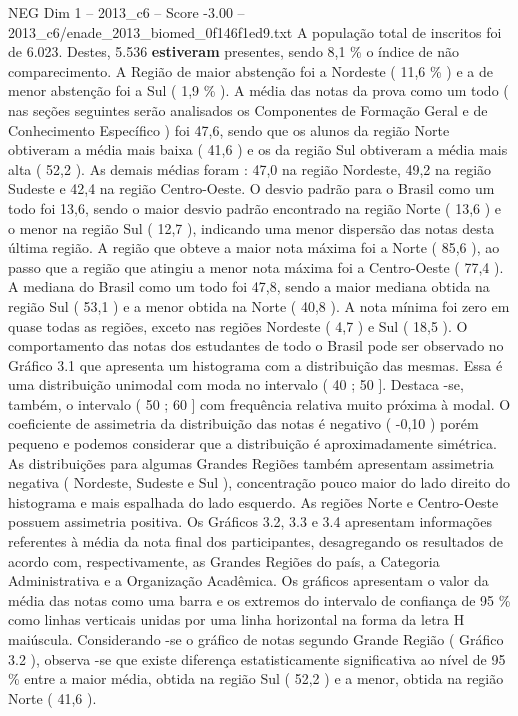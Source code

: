 \begin{textsample}{NEG Dim 1 – 2013\_c6 – Score -3.00 – 2013\_c6/enade\_2013\_biomed\_0f146f1ed9.txt}
A população total de inscritos foi de 6.023.
Destes, 5.536 \textbf{estiveram} presentes, sendo 8,1 \% o índice de não comparecimento.
A Região de maior abstenção foi a Nordeste ( 11,6 \% ) e a de menor abstenção foi a Sul ( 1,9 \% ).
A média das notas da prova como um todo ( nas seções seguintes serão analisados os Componentes de Formação Geral e de Conhecimento Específico ) foi 47,6, sendo que os alunos da região Norte obtiveram a média mais baixa ( 41,6 ) e os da região Sul obtiveram a média mais alta ( 52,2 ).
As demais médias foram : 47,0 na região Nordeste, 49,2 na região Sudeste e 42,4 na região Centro-Oeste.
O desvio padrão para o Brasil como um todo foi 13,6, sendo o maior desvio padrão encontrado na região Norte ( 13,6 ) e o menor na região Sul ( 12,7 ), indicando uma menor dispersão das notas desta última região.
A região que obteve a maior nota máxima foi a Norte ( 85,6 ), ao passo que a região que atingiu a menor nota máxima foi a Centro-Oeste ( 77,4 ).
A mediana do Brasil como um todo foi 47,8, sendo a maior mediana obtida na região Sul ( 53,1 ) e a menor obtida na Norte ( 40,8 ).
A nota mínima foi zero em quase todas as regiões, exceto nas regiões Nordeste ( 4,7 ) e Sul ( 18,5 ).
O comportamento das notas dos estudantes de todo o Brasil pode ser observado no Gráfico 3.1 que apresenta um histograma com a distribuição das mesmas.
Essa é uma distribuição unimodal com moda no intervalo ( 40 ; 50 ].
Destaca -se, também, o intervalo ( 50 ; 60 ] com frequência relativa muito próxima à modal.
O coeficiente de assimetria da distribuição das notas é negativo ( -0,10 ) porém pequeno e podemos considerar que a distribuição é aproximadamente simétrica.
As distribuições para algumas Grandes Regiões também apresentam assimetria negativa ( Nordeste, Sudeste e Sul ), concentração pouco maior do lado direito do histograma e mais espalhada do lado esquerdo.
As regiões Norte e Centro-Oeste possuem assimetria positiva.
Os Gráficos 3.2, 3.3 e 3.4 apresentam informações referentes à média da nota final dos participantes, desagregando os resultados de acordo com, respectivamente, as Grandes Regiões do país, a Categoria Administrativa e a Organização Acadêmica.
Os gráficos apresentam o valor da média das notas como uma barra e os extremos do intervalo de confiança de 95 \% como linhas verticais unidas por uma linha horizontal na forma da letra H maiúscula.
Considerando -se o gráfico de notas segundo Grande Região ( Gráfico 3.2 ), observa -se que existe diferença estatisticamente significativa ao nível de 95 \% entre a maior média, obtida na região Sul ( 52,2 ) e a menor, obtida na região Norte ( 41,6 ).

\end{textsample}
